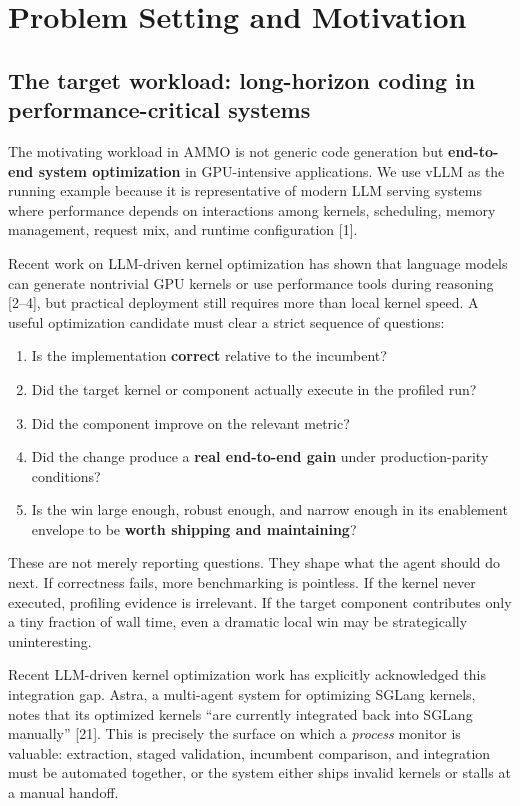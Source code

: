 \documentclass[11pt]{article}
\begin{document}
\section{Problem Setting and Motivation}

\subsection{The target workload: long-horizon coding in performance-critical systems}

The motivating workload in AMMO is not generic code generation but \textbf{end-to-end system optimization} in GPU-intensive applications. We use vLLM as the running example because it is representative of modern LLM serving systems where performance depends on interactions among kernels, scheduling, memory management, request mix, and runtime configuration [1].

Recent work on LLM-driven kernel optimization has shown that language models can generate nontrivial GPU kernels or use performance tools during reasoning [2--4], but practical deployment still requires more than local kernel speed. A useful optimization candidate must clear a strict sequence of questions:

\begin{enumerate}[leftmargin=*,itemsep=2pt]
  \item Is the implementation \textbf{correct} relative to the incumbent?
  \item Did the target kernel or component actually execute in the profiled run?
  \item Did the component improve on the relevant metric?
  \item Did the change produce a \textbf{real end-to-end gain} under production-parity conditions?
  \item Is the win large enough, robust enough, and narrow enough in its enablement envelope to be \textbf{worth shipping and maintaining}?
\end{enumerate}

These are not merely reporting questions. They shape what the agent should do next. If correctness fails, more benchmarking is pointless. If the kernel never executed, profiling evidence is irrelevant. If the target component contributes only a tiny fraction of wall time, even a dramatic local win may be strategically uninteresting.

Recent LLM-driven kernel optimization work has explicitly acknowledged this integration gap. Astra, a multi-agent system for optimizing SGLang kernels, notes that its optimized kernels ``are currently integrated back into SGLang manually'' [21]. This is precisely the surface on which a \emph{process} monitor is valuable: extraction, staged validation, incumbent comparison, and integration must be automated together, or the system either ships invalid kernels or stalls at a manual handoff.
\end{document}
